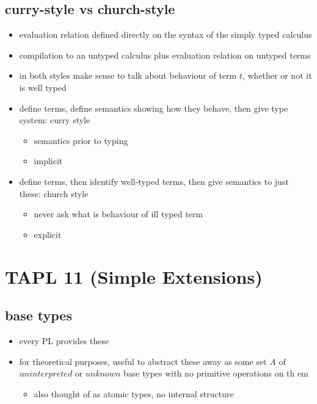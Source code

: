 \documentclass[11pt]{article}
\begin{document}
\subsection{curry-style vs church-style}
\label{sec:org5ef02b2}
\begin{itemize}
\item evaluation relation defined directly on the syntax of the simply typed calculus
\item compilation to an untyped calculus plus evaluation relation on untyped terms

\item in both styles make sense to talk about behaviour of term \(t\), whether or not it is well typed
\item define terms, define semantics showing how they behave, then give type system: curry style
\begin{itemize}
\item semantics prior to typing
\item implicit
\end{itemize}
\item define terms, then identify well-typed terms, then give semantics to just these: church style
\begin{itemize}
\item never ask what is behaviour of ill typed term
\item explicit
\end{itemize}
\end{itemize}

\section{TAPL 11 (Simple Extensions)}
\label{sec:org7024592}


\subsection{base types}
\label{sec:orgfea51d5}
\begin{itemize}
\item every PL provides these
\item for theoretical purposes, useful to abstract these away as some set \(A\) of \(uninterpreted\) or \(unknown\) base types with no primitive operations on th em
\begin{itemize}
\item also thought of as atomic types, no internal structure
\end{itemize}
\end{itemize}
\end{document}
